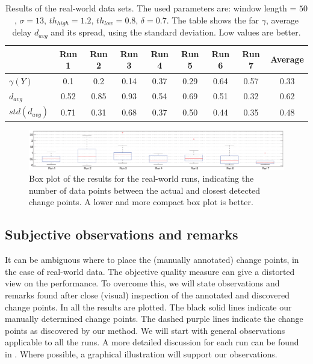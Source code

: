 \begin{table}
  \centering
  \caption[Results real world runs]{Results of the real-world data sets. The used parameters are: window length = $50$, $\sigma = 13$, $th_{high} = 1.2$, $th_{low} = 0.8$, $\delta = 0.7$.
  The table shows the \gls{far} $\gamma$, average delay $d_{avg}$ and its spread, using the standard deviation.
  Low values are better.
  }
  \begin{tabulary}{\textwidth}{|l|c|c|c|c|c|c|c||c|}
     & Run 1 & Run 2 & Run 3 & Run 4 & Run 5 & Run 6 & Run 7 & Average \\
    \hline
    $\gamma(Y)$ & 0.1 & 0.2 & 0.14 & 0.37 & 0.29 & 0.64 & 0.57 & 0.33 \\
    \hline
    $d_{avg}$ & 0.52 & 0.85 & 0.93 & 0.54 & 0.69 & 0.51 & 0.32 & 0.62\\
    \hline
    $std(d_{avg})$ & 0.71 & 0.31 & 0.68 & 0.37 & 0.50 & 0.44 & 0.35 & 0.48 \\
    \hline
  \end{tabulary}
  \label{tab:results_final_real_world}
\end{table}

\begin{figure}
\centering
  \includegraphics[width=1\textwidth]{./Figures/chapter6/data_collection/boxplot_final_runs.eps}
  \caption[Box plot results real-world runs]{Box plot of the results for the real-world runs, indicating the number of data points between the actual and closest detected change points. A lower and more compact box plot is better.}
  \label{fig:boxplot_final_real_world_runs}
\end{figure}

\subsection{Subjective observations and remarks}\label{subsec:subjective_results}
It can be ambiguous where to place the (manually annotated) change points, in the case of real-world data.
The objective quality measure can give a distorted view on the performance.
To overcome this, we will state observations and remarks found after close (visual) inspection of the annotated and discovered change points.
In  all the results are plotted.
The black solid lines indicate our manually determined change points.
The dashed purple lines indicate the change points as discovered by our method.
We will start with general observations applicable to all the runs.
A more detailed discussion for each run can be found in .
Where possible, a graphical illustration will support our observations.

